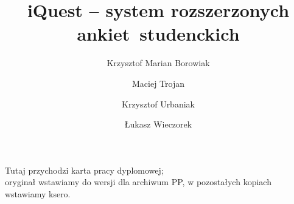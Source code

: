 \documentclass[polish,bachelor,a4paper,oneside]{ppfcmthesis}
\author{%
   Krzysztof Marian Borowiak \album{94269} \and 
   Maciej Trojan \album{94378} \and 
   Krzysztof Urbaniak \album{94381} \and 
   Łukasz Wieczorek \album{94385}}
\title{iQuest -- system rozszerzonych ankiet~studenckich}                   %
\begin{document}
\frontmatter\pagestyle{empty}%
\maketitle\cleardoublepage%

\thispagestyle{empty}\vspace*{\fill}%
\begin{center}Tutaj przychodzi karta pracy dyplomowej;\\oryginał wstawiamy do wersji dla archiwum PP, w pozostałych kopiach wstawiamy ksero.\end{center}%
\vfill\cleardoublepage%

\pagestyle{ppfcmthesis}%
\tableofcontents* \cleardoublepage%

\mainmatter%










\cleardoublepage\appendix%


%

{\raggedright\sloppy\small}

\ppcolophon
\end{document}
